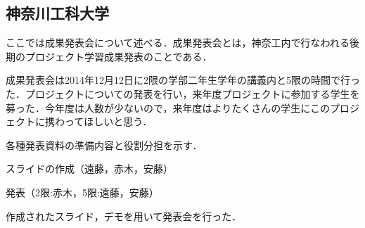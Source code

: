 \subsection{神奈川工科大学} 
\par ここでは成果発表会について述べる．成果発表会とは，神奈工内で行なわれる後期のプロジェクト学習成果発表のことである．
\par 成果発表会は2014年12月12日に2限の学部二年生学年の講義内と5限の時間で行った．プロジェクトについての発表を行い，来年度プロジェクトに参加する学生を募った．今年度は人数が少ないので，来年度はよりたくさんの学生にこのプロジェクトに携わってほしいと思う．
\par 各種発表資料の準備内容と役割分担を示す．
\par スライドの作成（遠藤，赤木，安藤）
\par 発表（2限:赤木，5限:遠藤，安藤）
\par 作成されたスライド，デモを用いて発表会を行った．
